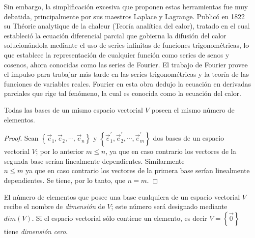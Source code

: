 \begin{parchment}
{Sin embargo, la simplificación excesiva que proponen estas herramientas fue muy debatida, principalmente por sus maestros Laplace y Lagrange.
Publicó en 1822 su Théorie analytique de la chaleur (Teoría analítica del calor), tratado en el cual estableció la ecuación diferencial parcial que gobierna la difusión del calor solucionándola mediante el uso de series infinitas de funciones trigonométricas, lo que establece la representación de cualquier función como series de senos y cosenos, ahora conocidas como las series de Fourier. El trabajo de Fourier provee el impulso para trabajar más tarde en las series trigonométricas y la teoría de las funciones de variables reales.
Fourier en esta obra dedujo la ecuación en derivadas parciales que rige tal fenómeno, la cual es conocida como la ecuación del calor.  \cite{fourier}}
\end{parchment}


\bigskip

\bigskip


\begin{theorem}
\label{2122}
Todas las bases de un mismo espacio vectorial $V$ poseen el mismo número de elementos.

\begin{proof}
Sean $\left\{\vec{e}_1,\vec{e}_2,\cdots, \vec{e}_n\right\}$  y $\left\{\vec{e}^{\prime}_1,\vec{ e}^{\prime}_2,\cdots, \vec{e}^{\prime}_m\right\}$ dos bases de un espacio vectorial $V$; por lo anterior $m\leq n$, ya que en caso contrario los vectores de la segunda base serían linealmente dependientes. Similarmente  \\ $n\leq m$
ya que en caso contrario los vectores de la primera base serían linealmente dependientes. Se tiene, por lo tanto, que $n=m$.

\end{proof}
\end{theorem}

\bigskip


El número de elementos que posee una base cualquiera de un espacio vectorial $V$ recibe el nombre de \textit{dimensión} de $V$; este número será designado mediante $dim(V)$. Si el espacio vectorial sólo contiene un elemento, es decir $V=\left\{\vec{0}\right\}$ tiene \textsl{dimensión cero}.

